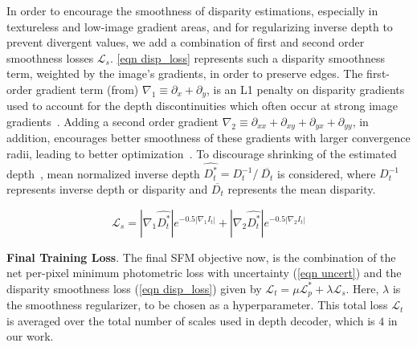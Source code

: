 \documentclass{bmvc2k}
\begin{document}
In order to encourage the smoothness of disparity estimations, especially in textureless and low-image gradient areas, and for regularizing inverse depth to prevent divergent values, we add a combination of first and second order smoothness losses $\mathcal{L}_{s}$. \autoref{eqn disp_loss} represents such a disparity smoothness term, weighted by the image's gradients, in order to preserve edges. The first-order gradient term (from) $\nabla_{1}\equiv \partial_{x}+ \partial_{y}$, is an L1 penalty on disparity gradients used to account for the depth discontinuities which often occur at strong image gradients~\cite{heise2013pm}. Adding a second order gradient $\nabla_{2}\equiv \partial_{xx}+ \partial_{xy}+ \partial_{yx} + \partial_{yy}$, in addition, encourages better smoothness of these gradients with larger convergence radii, leading to better optimization~\cite{shu2020feature}. To discourage shrinking of the estimated depth~\cite{godard2019digging}, mean normalized inverse depth $\hat{D_{t}^*}=D_{t}^{-1}/\ \overline{D_{t}}$ is considered, where $D_{t}^{-1}$ represents inverse depth or disparity and $\overline{D_{t}}$ represents the mean disparity.


\begin{equation}
\mathcal{L}_{s} = \left | \nabla_{1}\hat{D_{t}^*} \right | e^{-0.5\left | \nabla_{1}I_{t} \right |} + \left | \nabla_{2}\hat{D_{t}^*} \right | e^{-0.5\left | \nabla_{2}I_{t} \right |}
\label{eqn disp_loss}
\end{equation}

\textbf{Final Training Loss}. The final SFM objective now, is the combination of the net per-pixel minimum photometric loss with uncertainty (\autoref{eqn uncert}) and the disparity smoothness loss (\autoref{eqn disp_loss}) given by $\mathcal{L}_{t} = \mu \mathcal{L}_{p}^* + \lambda \mathcal{L}_{s}$. Here, $\lambda$ is the smoothness regularizer, to be chosen as a hyperparameter. This total loss $\mathcal{L}_{t}$ is averaged over the total number of scales used in depth decoder, which is $4$ in our work.
\end{document}
